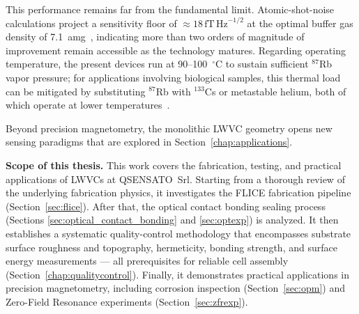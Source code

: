 This performance remains far from the fundamental limit. Atomic-shot-noise calculations 
project a sensitivity floor of $\approx 18\,\text{fT}\,\text{Hz}^{-1/2}$ at the optimal 
buffer gas density of 7.1~amg~\cite{zanoni2024}, indicating more than two orders of 
magnitude of improvement remain accessible as the technology matures. Regarding operating 
temperature, the present devices run at 90--100~$^\circ$C to sustain sufficient $^{87}$Rb 
vapor pressure; for applications involving biological samples, this thermal load can be 
mitigated by substituting $^{87}$Rb with $^{133}$Cs or metastable helium, both of which 
operate at lower temperatures~\cite{zanoni2024}.

Beyond precision magnetometry, the monolithic LWVC geometry opens new sensing paradigms 
that are explored in Section~\ref{chap:applications}.

\medskip\noindent
\textbf{Scope of this thesis.} This work covers the fabrication, testing, and practical 
applications of LWVCs at QSENSATO~Srl. Starting from a thorough review of the 
underlying fabrication physics, it investigates the FLICE fabrication pipeline 
(Section~\ref{sec:flice}). After that, the optical contact bonding sealing process 
(Sections \ref{sec:optical_contact_bonding} and \ref{sec:optexp}) is analyzed. It then 
establishes a systematic quality-control methodology that encompasses substrate surface 
roughness and topography, hermeticity, bonding strength, and surface energy 
measurements --- all prerequisites for reliable cell assembly 
(Section~\ref{chap:qualitycontrol}). Finally, it demonstrates practical applications in 
precision magnetometry, including corrosion inspection (Section~\ref{sec:opm}) and 
Zero-Field Resonance experiments (Section~\ref{sec:zfrexp}).
